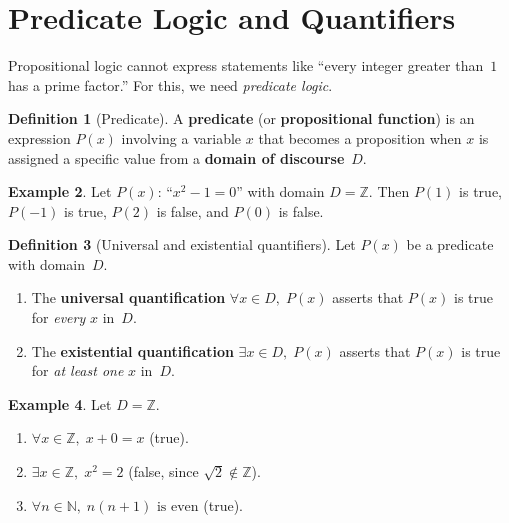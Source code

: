 \documentclass[12pt,a4paper,openany]{book}
\theoremstyle{definition}
\newtheorem{definition}{Definition}[chapter]
\newtheorem{example}[definition]{Example}
\theoremstyle{plain}
\theoremstyle{remark}
\newcommand{\N}{\mathbb{N}}
\newcommand{\Z}{\mathbb{Z}}
\begin{document}
\section{Predicate Logic and Quantifiers}
\label{sec:predicates}

Propositional logic cannot express statements like ``every integer greater than~$1$
has a prime factor.'' For this, we need \emph{predicate logic}.

\begin{definition}[Predicate]
\label{def:predicate}
A \textbf{predicate} (or \textbf{propositional function}) is an
expression $P(x)$ involving a variable $x$ that becomes a proposition when $x$ is
assigned a specific value from a \textbf{domain of discourse}~$D$.
\end{definition}

\begin{example}
\label{ex:predicate}
Let $P(x)$: ``$x^2 - 1 = 0$'' with domain $D = \Z$.
Then $P(1)$ is true, $P(-1)$ is true, $P(2)$ is false, and $P(0)$ is false.
\end{example}

\begin{definition}[Universal and existential quantifiers]
\label{def:quantifiers}
Let $P(x)$ be a predicate with domain~$D$.
\begin{enumerate}[nosep]
  \item The \textbf{universal quantification}
        $\forall x \in D,\; P(x)$ asserts that $P(x)$ is true for
        \emph{every} $x$ in~$D$.
  \item The \textbf{existential quantification}
        $\exists x \in D,\; P(x)$ asserts that $P(x)$ is true for
        \emph{at least one} $x$ in~$D$.
\end{enumerate}
\end{definition}

\begin{example}
\label{ex:quantifier-statements}
Let $D = \Z$.
\begin{enumerate}[nosep]
  \item $\forall x \in \Z,\; x + 0 = x$ \quad (true).
  \item $\exists x \in \Z,\; x^2 = 2$ \quad (false, since $\sqrt{2} \notin \Z$).
  \item $\forall n \in \N,\; n(n+1) \text{ is even}$ \quad (true).
\end{enumerate}
\end{example}
\end{document}
